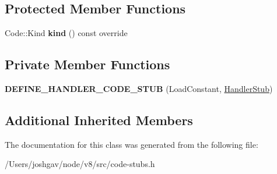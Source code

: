 \subsection*{Protected Member Functions}
\begin{DoxyCompactItemize}
\item 
Code\+::\+Kind {\bfseries kind} () const  override\hypertarget{classv8_1_1internal_1_1_load_constant_stub_ab72a0b412ea0275c41bcbbc3573ed024}{}\label{classv8_1_1internal_1_1_load_constant_stub_ab72a0b412ea0275c41bcbbc3573ed024}

\end{DoxyCompactItemize}
\subsection*{Private Member Functions}
\begin{DoxyCompactItemize}
\item 
{\bfseries D\+E\+F\+I\+N\+E\+\_\+\+H\+A\+N\+D\+L\+E\+R\+\_\+\+C\+O\+D\+E\+\_\+\+S\+T\+UB} (Load\+Constant, \hyperlink{classv8_1_1internal_1_1_handler_stub}{Handler\+Stub})\hypertarget{classv8_1_1internal_1_1_load_constant_stub_a6a9ae1100a7b6ad91643a72544e2d4d9}{}\label{classv8_1_1internal_1_1_load_constant_stub_a6a9ae1100a7b6ad91643a72544e2d4d9}

\end{DoxyCompactItemize}
\subsection*{Additional Inherited Members}


The documentation for this class was generated from the following file\+:\begin{DoxyCompactItemize}
\item 
/\+Users/joshgav/node/v8/src/code-\/stubs.\+h\end{DoxyCompactItemize}
